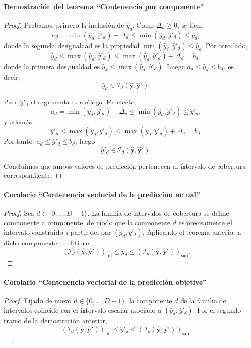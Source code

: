 \documentclass[12pt]{report} %
\begin{document}
\paragraph*{Demostración del teorema ``Contenencia por componente''}
\begin{proof}
    Probamos primero la inclusión de $\hat{y}_d$. Como $\Delta_d \ge 0$, se tiene
    $$a_d = \min(\hat{y}_d, \hat{y}'_d) - \Delta_d \le \min(\hat{y}_d, \hat{y}'_d) \le \hat{y}_d,$$
    donde la segunda desigualdad es la propiedad $\min(\hat{y}_d, \hat{y}'_d) \le \hat{y}_d$. Por otro lado,
    $$\hat{y}_d \le \max(\hat{y}_d, \hat{y}'_d) \le \max(\hat{y}_d, \hat{y}'_d) + \Delta_d = b_d,$$
    donde la primera desigualdad es $\hat{y}_d \le \max(\hat{y}_d, \hat{y}'_d)$. Luego $a_d \le \hat{y}_d \le b_d$, es decir,
    $$\hat{y}_d \in \mathcal{I}_d(\hat{\mathbf{y}}, \hat{\mathbf{y}}').$$

    Para $\hat{y}'_d$ el argumento es análogo. En efecto,
    $$a_d = \min(\hat{y}_d, \hat{y}'_d) - \Delta_d \le \min(\hat{y}_d, \hat{y}'_d) \le \hat{y}'_d,$$
    y además
    $$\hat{y}'_d \le \max(\hat{y}_d, \hat{y}'_d) \le \max(\hat{y}_d, \hat{y}'_d) + \Delta_d = b_d.$$
    Por tanto, $a_d \le \hat{y}'_d \le b_d$, luego
    $$\hat{y}'_d \in \mathcal{I}_d(\hat{\mathbf{y}}, \hat{\mathbf{y}}').$$

    Concluimos que ambos valores de predicción pertenecen al intervalo de cobertura correspondiente.
\end{proof}

\paragraph*{Corolario ``Contenencia vectorial de la predicción actual''}
\begin{proof}
    Sea $d \in \{0, \ldots, D-1\}$. La familia de intervalos de cobertura se define componente a componente, de modo que la componente $d$ es precisamente el intervalo construido a partir del par $(\hat{y}_d, \hat{y}'_d)$. Aplicando el teorema anterior a dicha componente se obtiene
    $$(\mathcal{I}_d(\hat{\mathbf{y}}, \hat{\mathbf{y}}'))_{\mathrm{inf}} \le \hat{y}_d \le (\mathcal{I}_d(\hat{\mathbf{y}}, \hat{\mathbf{y}}'))_{\mathrm{sup}}.$$
\end{proof}

\paragraph*{Corolario ``Contenencia vectorial de la predicción objetivo''}
\begin{proof}
    Fijado de nuevo $d \in \{0, \ldots, D-1\}$, la componente $d$ de la familia de intervalos coincide con el intervalo escalar asociado a $(\hat{y}_d, \hat{y}'_d)$. Por el segundo tramo de la demostración anterior,
    $$(\mathcal{I}_d(\hat{\mathbf{y}}, \hat{\mathbf{y}}'))_{\mathrm{inf}} \le \hat{y}'_d \le (\mathcal{I}_d(\hat{\mathbf{y}}, \hat{\mathbf{y}}'))_{\mathrm{sup}}.$$
\end{proof}
\end{document}
